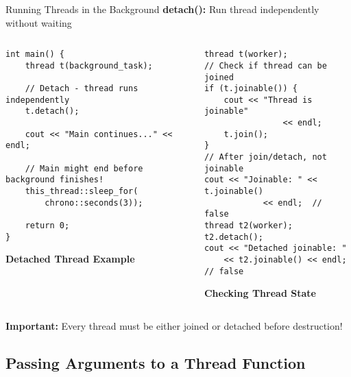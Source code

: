 \begin{frame}[fragile]{Running Threads in the Background}
	\textbf{detach():} Run thread independently without waiting

	\begin{columns}
		\begin{column}{0.5\textwidth}
			\begin{verbatim}
int main() {
    thread t(background_task);

    // Detach - thread runs independently
    t.detach();

    cout << "Main continues..." << endl;

    // Main might end before background finishes!
    this_thread::sleep_for(
        chrono::seconds(3));

    return 0;
}
			\end{verbatim}
			\textbf{Detached Thread Example}
		\end{column}
		\begin{column}{0.5\textwidth}
			\begin{verbatim}
thread t(worker);
// Check if thread can be joined
if (t.joinable()) {
    cout << "Thread is joinable"
                << endl;
    t.join();
}
// After join/detach, not joinable
cout << "Joinable: " << t.joinable()
            << endl;  // false
thread t2(worker);
t2.detach();
cout << "Detached joinable: "
    << t2.joinable() << endl;  // false
			\end{verbatim}
			\textbf{Checking Thread State}
		\end{column}
	\end{columns}

	\scriptsize
	\textbf{Important:} Every thread must be either joined or detached before destruction!
\end{frame}

\subsection{Passing Arguments to a Thread Function}

